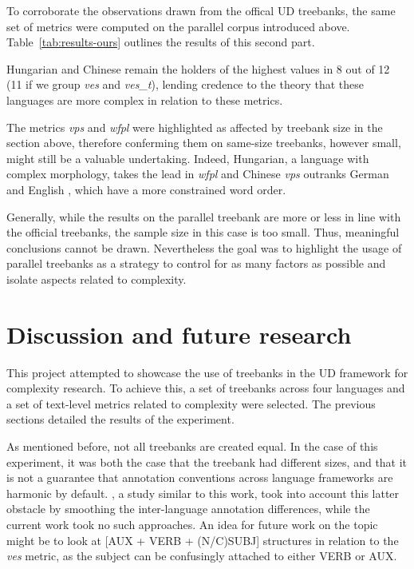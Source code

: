 \documentclass[11pt]{article}
\begin{document}


To corroborate the observations drawn from the offical UD treebanks, the same set of metrics were computed on the parallel corpus introduced above. Table~\ref{tab:results-ours} outlines the results of this second part.

Hungarian and Chinese remain the holders of the highest values in 8 out of 12 (11 if we group \emph{ves} and \emph{ves\_t}), lending credence to the theory that these languages are more complex in relation to these metrics. 

The metrics \emph{vps} and \emph{wfpl} were highlighted as affected by treebank size in the section above, therefore conferming them on same-size treebanks, however small, might still be a valuable undertaking. Indeed, Hungarian, a language with complex morphology, takes the lead in \emph{wfpl} and Chinese \emph{vps} outranks German and English , which have a more constrained word order. 

Generally, while the results on the parallel treebank are more or less in line with the official treebanks, the sample size in this case is too small. Thus, meaningful conclusions cannot be drawn. Nevertheless the goal was to highlight the usage of parallel treebanks as a strategy to control for as many factors as possible and isolate aspects related to complexity.

\section{Discussion and future research}

This project attempted to showcase the use of treebanks in the UD framework for complexity research. To achieve this, a set of treebanks across four languages and a set of text-level metrics related to complexity were selected. The previous sections detailed the results of the experiment.

As mentioned before, not all treebanks are created equal. In the case of this experiment, it was both the case that the treebank had different sizes, and that it is not a guarantee that annotation conventions across language frameworks are harmonic by default. \citep{berdicevskis-etal-2018-using}, a study similar to this work, took into account this latter obstacle by smoothing the inter-language annotation differences, while the current work took no such approaches. An idea for future work on the topic might be to look at [AUX + VERB + (N/C)SUBJ] structures in relation to the \emph{ves} metric, as the subject can be confusingly attached to either VERB or AUX.
\end{document}
